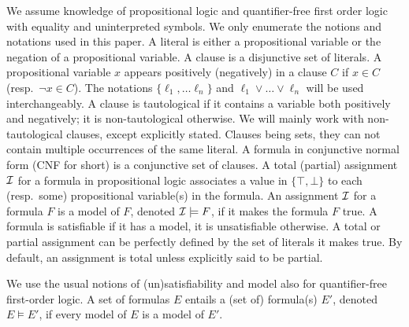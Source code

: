 \documentclass[smallextended]{svjour3}
\begin{document}
We assume knowledge of propositional logic and quantifier-free first order logic
with equality and uninterpreted symbols.  We only enumerate the notions and
notations used in this paper.
A literal is either a propositional variable or the negation of a propositional
variable.  A clause is a disjunctive set of literals.  A propositional variable
$x$ appears positively (negatively) in a clause $C$ if $x \in C$ (resp.\ $\neg x
\in C$).  The notations $\{\ell_1, \dots \ell_n\}$ and $\ell_1 \vee \dots \vee
\ell_n$ will be used interchangeably.  A clause is tautological if it contains a variable both positively and negatively; it is non-tautological otherwise.  We will mainly work with non-tautological clauses, except explicitly stated.  Clauses being sets, they can not contain multiple occurrences of the same literal.  
A formula in conjunctive normal form (CNF
for short) is a conjunctive set of clauses.  A total (partial) assignment $\cal
I$ for a formula in propositional logic associates a value in $\{\top, \bot\}$
to each (resp.\ some) propositional variable(s) in the formula.  An assignment
$\cal I$ for a formula $F$ is a model of $F$, denoted ${\cal I}\models F$, if it makes
the formula $F$ true.  A formula is satisfiable if it has a model, it is
unsatisfiable otherwise.  A total or partial assignment can be perfectly
defined by the set of literals it makes true.  By default, an assignment is
total unless explicitly said to be partial.

We use the usual notions of (un)satisfiability and model also for
quantifier-free first-order logic.  
A set of formulas $E$ entails a (set of) formula(s) $E'$, denoted $E\models E'$, if every
model of $E$ is a model of $E'$.

\end{document}
